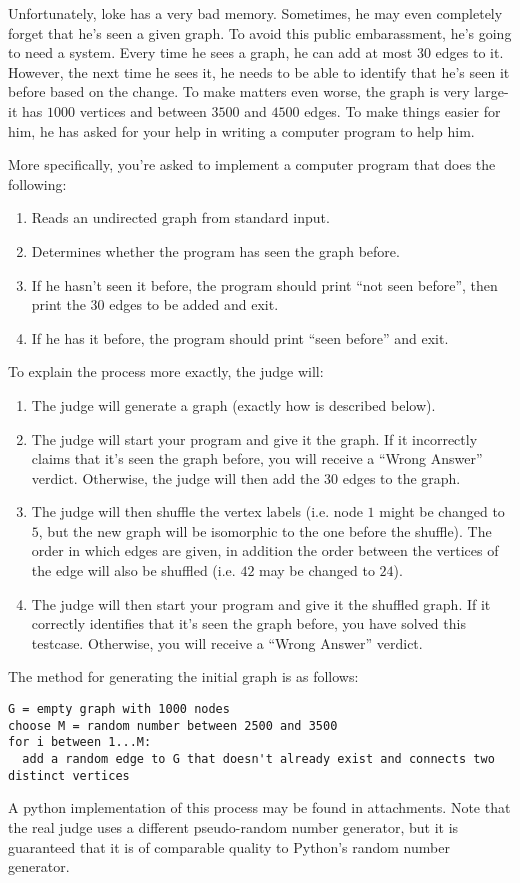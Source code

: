 \noindent
Unfortunately, loke has a very bad memory. Sometimes, he may even completely forget that he's seen a given graph. 
To avoid this public embarassment, he's going to need a system. Every time he sees a graph, he can add at most $30$
edges to it. However, the next time he sees it, he needs to be able to identify that he's seen it before based on the
change. To make matters even worse, the graph is very large- it has $1000$ vertices and between $3500$ and $4500$ edges.
To make things easier for him, he has asked for your help in writing a computer program to help him.

More specifically, you're asked to implement a computer program that does the following:
\begin{enumerate}
  \item Reads an undirected graph from standard input.
  \item Determines whether the program has seen the graph before.
  \item If he hasn't seen it before, the program should print ``not seen before'', then print the $30$ edges to be added and exit.
  \item If he has it before, the program should print ``seen before'' and exit.
\end{enumerate}
To explain the process more exactly, the judge will:
\begin{enumerate}
  \item The judge will generate a graph (exactly how is described below).
  \item The judge will start your program and give it the graph. If it incorrectly claims that it's seen the graph before,
  you will receive a ``Wrong Answer'' verdict. Otherwise, the judge will then add the $30$ edges to the graph.
  \item The judge will then shuffle the vertex labels (i.e. node $1$ might be changed to $5$, but the new
  graph will be isomorphic to the one before the shuffle). The order in which edges are given, in addition the
  order between the vertices of the edge will also be shuffled (i.e. $4 2$ may be changed to $2 4$).
  \item The judge will then start your program and give it the shuffled graph. If it correctly identifies that
  it's seen the graph before, you have solved this testcase. Otherwise, you will receive a ``Wrong Answer'' verdict.
\end{enumerate}

The method for generating the initial graph is as follows:
\begin{verbatim}
G = empty graph with 1000 nodes
choose M = random number between 2500 and 3500
for i between 1...M:
  add a random edge to G that doesn't already exist and connects two distinct vertices
\end{verbatim}
A python implementation of this process may be found in attachments. Note that the real judge uses a different pseudo-random
number generator, but it is guaranteed that it is of comparable quality to Python's random number generator.


